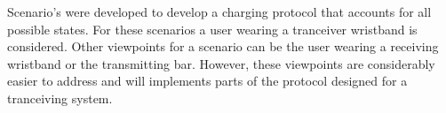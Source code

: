 %
Scenario's were developed to develop a charging protocol that accounts for all possible states. For these scenarios a user wearing a tranceiver wristband is considered. Other viewpoints for a scenario can be the user wearing a receiving wristband or the transmitting bar. However, these viewpoints are considerably easier to address and will implements parts of the protocol designed for a tranceiving system.